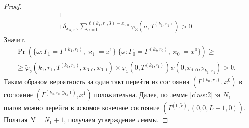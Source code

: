 \documentclass{report}
\begin{document}
\begin{proof}
\begin{multline*}
+\\+\delta_{x_{3,1},0} \sum_{a=0}^{\ell(k_1,r_1,3)-x_{3,0}}\varphi_3 (a,T^{(k_1,r_1)})>0.
\end{multline*}
Значит,
\begin{multline*}
\Pr (\{\omega\colon \Gamma_{1}=\Gamma^{(k_1,r_1)},\varkappa_{1}=x^1\}|\{\omega\colon  \Gamma_{0}=\Gamma^{(k_0,r_0)},\varkappa_0=x^0\})\geqslant \\
\geqslant \widetilde{\varphi}_3(k_1,r_1,T^{(k_1,r_1)},x_{3,0},x_{3,1})
\times
\varphi_1(0,T^{(k_1,r_1)})  \psi(0,x_{4,0}, p_{k_1,r_1}) > 0.
\end{multline*}
Таким образом вероятность за один такт перейти из состояния $(\Gamma^{(k_0,r_0)}, x^0)$ в состояние $ (\Gamma^{(k_0,r_0\oplus_{k_0}1)}, x^1)$ положительна.
Далее, по лемме \eqref{class:2} за $N_1$ шагов можно перейти в искомое конечное состояние $(\Gamma^{(0,\tilde{r} )}, (0,0,L+1,0))$. Полагая $N=N_1+1$, получаем утверждение леммы.
\end{proof}
\end{document}
